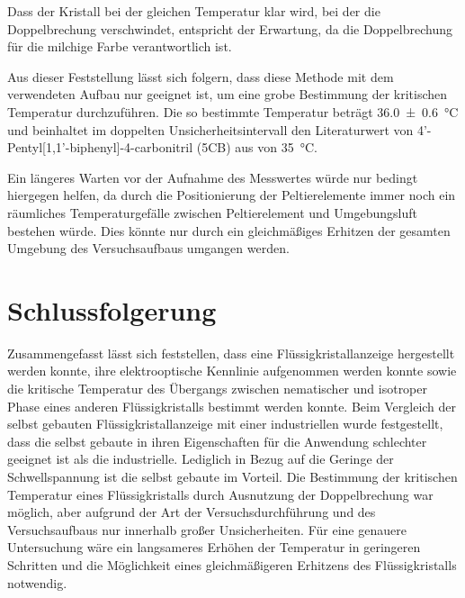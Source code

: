 \documentclass[
	a4paper,
	12pt,
	pagesize,
	ngerman
]{scrartcl}
\begin{document}
	Dass der Kristall bei der gleichen Temperatur klar wird, bei der die Doppelbrechung verschwindet, entspricht der Erwartung, da die Doppelbrechung für die milchige Farbe verantwortlich ist.

	Aus dieser Feststellung lässt sich folgern, dass diese Methode mit dem verwendeten Aufbau nur geeignet ist, um eine grobe Bestimmung der kritischen Temperatur durchzuführen.
  Die so bestimmte Temperatur beträgt \SI{36.0+-0.6}{\celsius} und beinhaltet im doppelten Unsicherheitsintervall den Literaturwert von 4’-Pentyl[1,1’-biphenyl]-4-carbonitril (5CB) aus \cite{Luk2004} von \SI{35}{\celsius}.

	Ein längeres Warten vor der Aufnahme des Messwertes würde nur bedingt hiergegen helfen, da durch die Positionierung der Peltierelemente immer noch ein räumliches Temperaturgefälle zwischen Peltierelement und Umgebungsluft bestehen würde.
	Dies könnte nur durch ein gleichmäßiges Erhitzen der gesamten Umgebung des Versuchsaufbaus umgangen werden.



	\section{Schlussfolgerung}

	Zusammengefasst lässt sich feststellen, dass eine Flüssigkristallanzeige hergestellt werden konnte, ihre elektrooptische Kennlinie aufgenommen werden konnte sowie die kritische Temperatur des Übergangs zwischen nematischer und isotroper Phase eines anderen Flüssigkristalls bestimmt werden konnte.
	Beim Vergleich der selbst gebauten Flüssigkristallanzeige mit einer industriellen wurde festgestellt, dass die selbst gebaute in ihren Eigenschaften für die Anwendung schlechter geeignet ist als die industrielle.
	Lediglich in Bezug auf die Geringe der Schwellspannung ist die selbst gebaute im Vorteil.
	Die Bestimmung der kritischen Temperatur eines Flüssigkristalls durch Ausnutzung der Doppelbrechung war möglich, aber aufgrund der Art der Versuchsdurchführung und des Versuchsaufbaus nur innerhalb großer Unsicherheiten.
	Für eine genauere Untersuchung wäre ein langsameres Erhöhen der Temperatur in geringeren Schritten und die Möglichkeit eines gleichmäßigeren Erhitzens des Flüssigkristalls notwendig.

	\printbibliography
\end{document}
